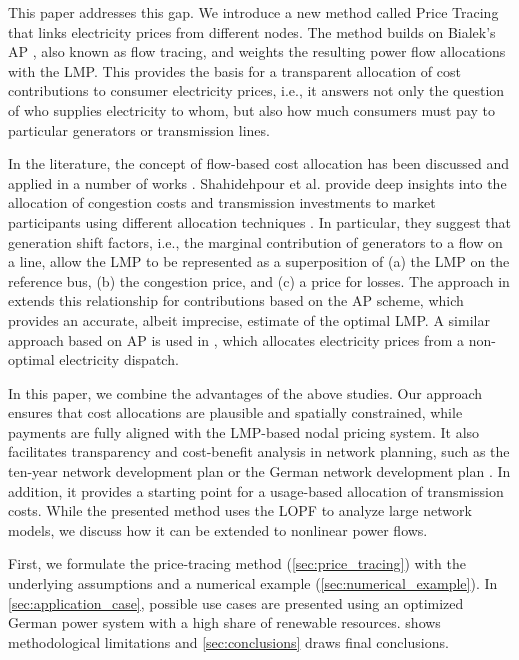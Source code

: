 \documentclass[11pt,twocolumn]{article}
\begin{document}
This paper addresses this gap. We introduce a new method called Price Tracing that links electricity prices from different nodes. The method builds on Bialek's \ac{AP} \cite{bialek_tracing_1996}, also known as flow tracing, and weights the resulting power flow allocations with the \ac{LMP}. This provides the basis for a transparent allocation of cost contributions to consumer electricity prices, i.e., it answers not only the question of who supplies electricity to whom, but also how much consumers must pay to particular generators or transmission lines. 

In the literature, the concept of flow-based cost allocation has been discussed and applied in a number of works \cite{galiana_transmission_2003,shahidehpour_market_2002,meng_investigation_2007,schafer_allocation_2017,nikoukar_transmission_2012,arabali_pricing_2012,wu_locational_2005}. Shahidehpour et al. provide deep insights into the allocation of congestion costs and transmission investments to market participants using different allocation techniques \cite{shahidehpour_market_2002}. In particular, they suggest that generation shift factors, i.e., the marginal contribution of generators to a flow on a line, allow the \ac{LMP} to be represented as a superposition of (a) the \ac{LMP} on the reference bus, (b) the congestion price, and (c) a price for losses. The approach in \cite{meng_investigation_2007} extends this relationship for contributions based on the \ac{AP} scheme, which provides an accurate, albeit imprecise, estimate of the optimal \ac{LMP}. A similar approach based on \ac{AP} is used in \cite{schafer_allocation_2017}, which allocates electricity prices from a non-optimal electricity dispatch.

In this paper, we combine the advantages of the above studies. Our approach ensures that cost allocations are plausible and spatially constrained, while payments are fully aligned with the \ac{LMP}-based nodal pricing system. It also facilitates transparency and cost-benefit analysis in network planning, such as the ten-year network development plan \cite{entso-e_completing_2020} or the German network development plan \cite{bundesnetzagentur_netzentwicklungsplan_2020}. In addition, it provides a starting point for a usage-based allocation of transmission costs. While the presented method uses the \ac{LOPF} to analyze large network models, we discuss how it can be extended to nonlinear power flows. 

First, we formulate the price-tracing method (\cref{sec:price_tracing}) with the underlying assumptions and a numerical example (\cref{sec:numerical_example}). In \cref{sec:application_case}, possible use cases are presented using an optimized German power system with a high share of renewable resources.  shows methodological limitations and \cref{sec:conclusions} draws final conclusions. 
\end{document}
